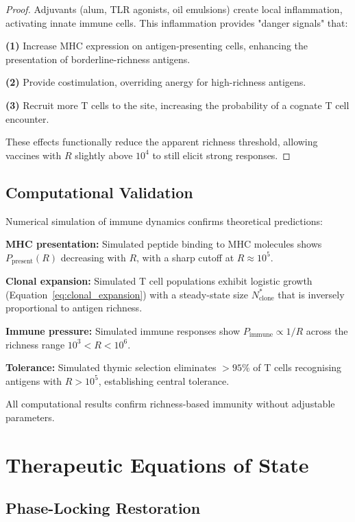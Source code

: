 \documentclass[11pt,twocolumn,a4paper]{article}
\theoremstyle{definition}
\theoremstyle{remark}
\begin{document}
\begin{proof}
Adjuvants (alum, TLR agonists, oil emulsions) create local inflammation, activating innate immune cells. This inflammation provides "danger signals" that:

\textbf{(1)} Increase MHC expression on antigen-presenting cells, enhancing the presentation of borderline-richness antigens.

\textbf{(2)} Provide costimulation, overriding anergy for high-richness antigens.

\textbf{(3)} Recruit more T cells to the site, increasing the probability of a cognate T cell encounter.

These effects functionally reduce the apparent richness threshold, allowing vaccines with $R$ slightly above $10^4$ to still elicit strong responses.
\end{proof}

\subsection{Computational Validation}

Numerical simulation of immune dynamics confirms theoretical predictions:

\textbf{MHC presentation:} Simulated peptide binding to MHC molecules shows $P_{\mathrm{present}}(R)$ decreasing with $R$, with a sharp cutoff at $R \approx 10^5$.

\textbf{Clonal expansion:} Simulated T cell populations exhibit logistic growth (Equation~\eqref{eq:clonal_expansion}) with a steady-state size $N_{\mathrm{clone}}^*$ that is inversely proportional to antigen richness.

\textbf{Immune pressure:} Simulated immune responses show $P_{\mathrm{immune}} \propto 1/R$ across the richness range $10^3 < R < 10^6$.

\textbf{Tolerance:} Simulated thymic selection eliminates $> 95\%$ of T cells recognising antigens with $R > 10^5$, establishing central tolerance.

All computational results confirm richness-based immunity without adjustable parameters.

\section{Therapeutic Equations of State}
\label{sec:therapeutic_eos}

\subsection{Phase-Locking Restoration}
\end{document}

